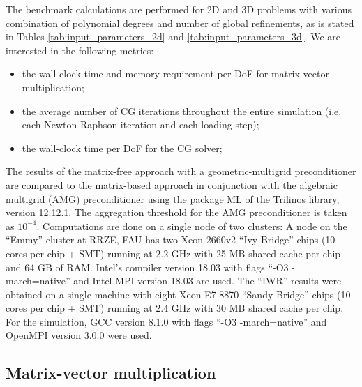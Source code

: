 \documentclass[times,doublespace]{nmeauth}
\begin{document}
The benchmark calculations are performed for 2D and 3D problems with various combination of polynomial degrees and number of global refinements, as is stated in Tables \ref{tab:input_parameters_2d} and \ref{tab:input_parameters_3d}.
%
We are interested in the following metrics:
\begin{itemize}
\item the wall-clock time and memory requirement per DoF for matrix-vector multiplication;
\item the average number of CG iterations throughout the entire simulation (i.e. each Newton-Raphson iteration and each loading step);
\item the wall-clock time per DoF for the CG solver;
\end{itemize}
%
The results of the matrix-free approach with a geometric-multigrid preconditioner are compared to the matrix-based approach in conjunction with the algebraic multigrid (AMG) preconditioner using the package ML of the Trilinos \cite{Heroux2005} library, version 12.12.1.
The aggregation threshold for the AMG preconditioner is taken as $10^{-4}$.
Computations are done on a single node of two clusters:
A node on the ``Emmy'' cluster at RRZE, FAU has two Xeon 2660v2 ``Ivy Bridge'' chips (10 cores per chip + SMT) running at 2.2 GHz with 25 MB shared cache per chip and 64 GB of RAM. Intel's compiler version 18.03 with flags ``-O3 -march=native'' and Intel MPI version 18.03 are used.
The ``IWR'' results were obtained on a single machine with eight Xeon E7-8870 ``Sandy Bridge'' chips (10 cores per chip  + SMT) running at 2.4 GHz with 30 MB shared cache per chip. For the simulation, GCC version 8.1.0 with flags ``-O3 -march=native'' and OpenMPI version 3.0.0 were used.

\subsection{Matrix-vector multiplication}
\end{document}
